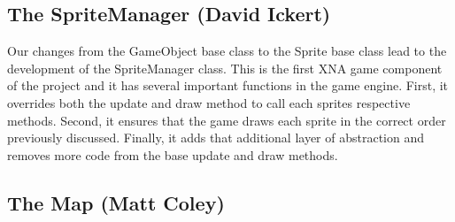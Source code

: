 \documentclass[]{article}
\begin{document}
		\subsection{The SpriteManager (David Ickert)}
			Our changes from the GameObject base class to the Sprite base class lead to the development of the SpriteManager class.  This is the first XNA game component of the project and it has several important functions in the game engine.  First, it overrides both the update and draw method to call each sprites respective methods.  Second, it ensures that the game draws each sprite in the correct order previously discussed.  Finally, it adds that additional layer of abstraction and removes more code from the base update and draw methods.
		\subsection{The Map (Matt Coley)}
			
			
\end{document}
